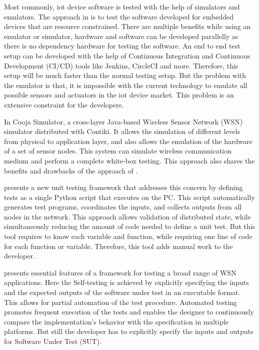 \documentclass[conference]{IEEEtran}
\theoremstyle{definition}
\begin{document}
Most commonly, \ac{iot} device software is tested with the help of simulators and emulators. 
The approach in \cite{karlesky2007mocking} is to test the software developed for embedded devices that are resource constrained. 
There are multiple benefits while using an emulator or simulator, hardware and software can be developed parallelly as there is no dependency hardware for testing the software. 
An end to end test setup can be developed with the help of Continuous Integration and Continuous Development (CI/CD) tools like Jenkins, CircleCI and more. 
Therefore, this setup will be much faster than the normal testing setup. 
But the problem with the emulator is that, it is impossible with the current technology to emulate all possible sensors and actuators in the \ac{iot} device market. 
This problem is an extensive constraint for the developers. 

In \cite{osterlind2006cross} Cooja Simulator, a cross-layer Java-based Wireless Sensor Network (WSN) simulator distributed with Contiki. 
It allows the simulation of different levels from physical to application layer, and also allows the emulation of the hardware of a set of sensor nodes. 
This system can simulate wireless communication medium and perform a complete white-box testing. 
This approach also shares the benefits and drawbacks of the approach of \cite{karlesky2007mocking}.
 
\cite{okola2010unit} presents a new unit testing framework that addresses this concern by defining tests as a single Python script that executes on the PC. 
This script automatically generates test programs, coordinates the inputs, and collects outputs from all nodes in the network. 
This approach allows validation of distributed state, while simultaneously reducing the amount of code needed to define a unit test. 
But this tool requires to know each variable and function, while requiring one line of code for each function or variable. 
Therefore, this tool adds manual work to the developer. 

\cite{woehrle2007increasing} presents essential features of a framework for testing a broad range of WSN applications. 
Here the Self-testing is achieved by explicitly specifying the inputs and the expected outputs of the software under test in an executable format. 
This allows for partial automation of the test procedure. 
Automated testing promotes frequent execution of the tests and enables the designer to continuously compare the implementation’s behavior with the specification in multiple platforms. 
But still the developer has to explicitly specify the inputs and outputs for Software Under Test (SUT).
\end{document}
